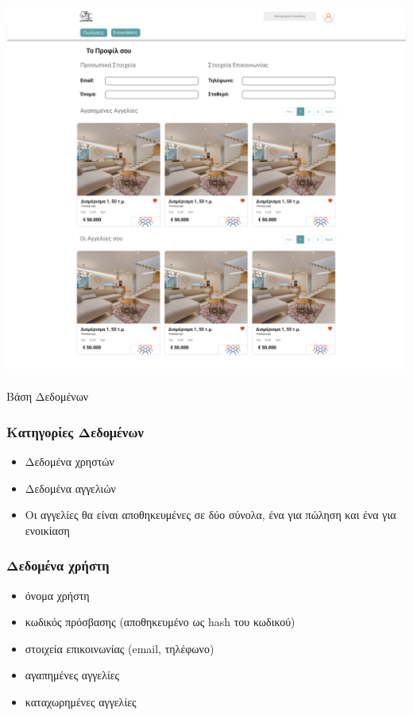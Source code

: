 \documentclass{beamer}
\begin{document}
\begin{frame}
	\includegraphics[width=\textwidth]{"User Profile.png"}
\end{frame}

\begin{frame}
	\begin{center}
		{\fontsize{20}{50}\selectfont Βάση Δεδομένων}
	\end{center}
\end{frame}

\begin{frame}
	\frametitle{Κατηγορίες Δεδομένων}

	\begin{itemize}
		\item Δεδομένα χρηστών
		\item Δεδομένα αγγελιών
		\item Οι αγγελίες θα είναι αποθηκευμένες σε δύο σύνολα, ένα για πώληση και ένα για ενοικίαση
	\end{itemize}
\end{frame}

\begin{frame}
	\frametitle{Δεδομένα χρήστη}

	\begin{itemize}
		\item όνομα χρήστη
		\item κωδικός πρόσβασης (αποθηκευμένο ως hash του κωδικού)
		\item στοιχεία επικοινωνίας (email, τηλέφωνο)
		\item αγαπημένες αγγελίες
		\item καταχωρημένες αγγελίες
	\end{itemize}
\end{frame}
\end{document}
